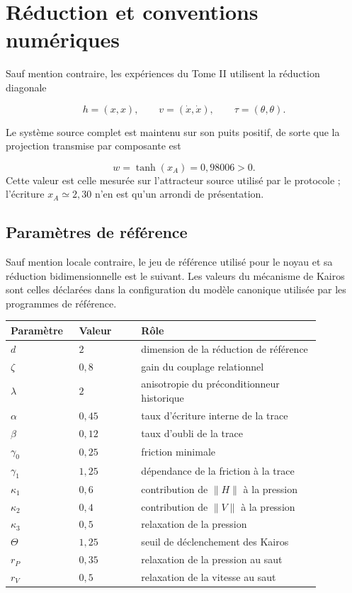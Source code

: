 \section{Réduction et conventions numériques}
\label{annexe-num-conventions}

Sauf mention contraire, les expériences du Tome II utilisent la
réduction diagonale

\[
h=(x,x),
\qquad
v=(\dot x,\dot x),
\qquad
\tau=(\theta,\theta).
\]

Le système source complet est maintenu sur son puits positif, de sorte
que la projection transmise par composante est

\[
w=\tanh(x_A)=0{,}98006>0.
\]
Cette valeur est celle mesurée sur l'attracteur source utilisé par le
protocole ; l'écriture \(x_A\simeq2{,}30\) n'en est qu'un arrondi de
présentation.

\subsection*{Paramètres de référence}

Sauf mention locale contraire, le jeu de référence utilisé pour le
noyau et sa réduction bidimensionnelle est le suivant. Les valeurs du
mécanisme de Kairos sont celles déclarées dans la configuration du
modèle canonique utilisée par les programmes de référence.

\begin{center}
\begin{tabular}{p{0.17\linewidth}p{0.18\linewidth}p{0.52\linewidth}}
\hline
Paramètre & Valeur & Rôle \\
\hline
$d$ & $2$ & dimension de la réduction de référence \\
$\zeta$ & $0{,}8$ & gain du couplage relationnel \\
$\lambda$ & $2$ & anisotropie du préconditionneur historique \\
$\alpha$ & $0{,}45$ & taux d'écriture interne de la trace \\
$\beta$ & $0{,}12$ & taux d'oubli de la trace \\
$\gamma_0$ & $0{,}25$ & friction minimale \\
$\gamma_1$ & $1{,}25$ & dépendance de la friction à la trace \\
$\kappa_1$ & $0{,}6$ & contribution de $\lVert H\rVert$ à la pression \\
$\kappa_2$ & $0{,}4$ & contribution de $\lVert V\rVert$ à la pression \\
$\kappa_3$ & $0{,}5$ & relaxation de la pression \\
$\Theta$ & $1{,}25$ & seuil de déclenchement des Kairos \\
$r_P$ & $0{,}35$ & relaxation de la pression au saut \\
$r_V$ & $0{,}5$ & relaxation de la vitesse au saut \\
\hline
\end{tabular}
\end{center}

